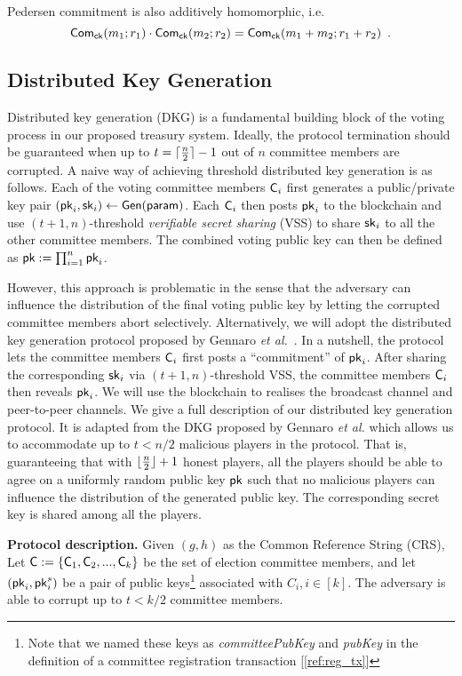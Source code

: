 Pedersen commitment is also additively homomorphic, i.e.
$$
\mathsf{Com}_{\mathsf{ck}}(m_1;r_1)\cdot \mathsf{Com}_{\mathsf{ck}}(m_2;r_2) = \mathsf{Com}_{\mathsf{ck}}(m_1+m_2; r_1+r_2)\enspace.
$$

\subsection{Distributed Key Generation}
Distributed key generation (DKG) is a fundamental building block of the voting process in our proposed treasury system. Ideally, the protocol termination should be guaranteed when up to $t=\lceil \frac{n}{2}\rceil -1$ out of $n$ committee members are corrupted.  A naive way of achieving threshold distributed key generation is as follows. Each of the voting committee members $\mathsf{C}_i$ first generates a public/private key pair $(\mathsf{pk}_i,\mathsf{sk}_i)\leftarrow\mathsf{Gen}(\mathsf{param})$. Each $\mathsf{C}_i$ then posts $\mathsf{pk}_i$ to the blockchain and use $(t+1,n)$-threshold \emph{verifiable secret sharing} (VSS) to share $\mathsf{sk}_i$ to all the other committee members. The combined voting public key can then be defined as $\mathsf{pk}:= \prod_{i=1}^{n} \mathsf{pk}_{i}$.

However, this approach is problematic in the sense that the adversary can influence the distribution of the final voting public key by letting the corrupted committee members abort selectively. Alternatively, we will adopt the distributed key generation protocol proposed by Gennaro {\em et al.}~\cite{GennaroDKG}. 
In a nutshell, the protocol lets the committee members $\mathsf{C}_i$ first posts a ``commitment'' of $\mathsf{pk}_i$. After sharing the corresponding $\mathsf{sk}_i$ via $(t+1,n)$-threshold VSS, the committee members $\mathsf{C}_i$ then reveals $\mathsf{pk}_i$.
%
We will use the blockchain to realises the broadcast channel and peer-to-peer channels. We give a full description of our distributed key generation protocol.  It is adapted from the DKG proposed by Gennaro {\em et al.} which allows us to accommodate up to $t < n/2$ malicious players in the protocol. That is, guaranteeing that with $ \lfloor \frac{n}{2}\rfloor+1$ honest players, all the players should be able to agree on a uniformly random  public key $\mathsf{pk}$ such that no malicious players can influence the distribution of the generated public key. The corresponding secret key is shared among all the players.

\medskip
\noindent\textbf{Protocol description.}
Given $(g,h)$ as the Common Reference String (CRS), Let $\mathsf{C}:=\{\mathsf{C}_1, \mathsf{C}_2,...,\mathsf{C}_k\}$ be the set of election committee members, and let $(\mathsf{pk}_i,\mathsf{pk}_i^s)$ be a pair of public keys\footnote{Note that we named these keys as \textit{committeePubKey} and \textit{pubKey} in the definition of a committee registration transaction [\ref{ref:reg_tx}]} associated with $C_i, i \in [k]$. The adversary is able to corrupt up to $t < k/2 $ committee members.\\


